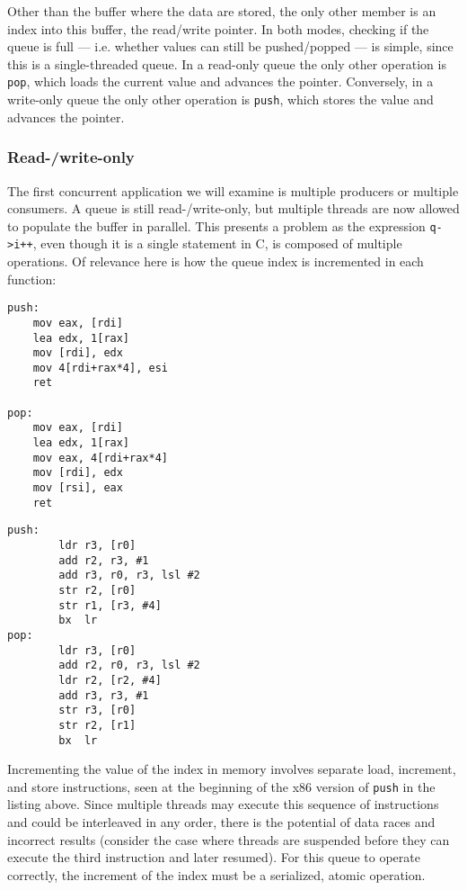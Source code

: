 Other than the buffer where the data are stored, the only other member is an
index into this buffer, the read/write pointer.  In both modes, checking if the
queue is full ---  i.e. whether values can still be pushed/popped --- is simple,
since this is a single-threaded queue.  In a read-only queue the only other
operation is \texttt{pop}, which loads the current value and advances the
pointer.  Conversely, in a write-only queue the only other operation is
\texttt{push}, which stores the value and advances the pointer.

\subsubsection{Read-/write-only}

The first concurrent application we will examine is multiple producers or
multiple consumers.  A queue is still read-/write-only, but multiple threads are
now allowed to populate the buffer in parallel.  This presents a problem as the
expression \texttt{q->i++}, even though it is a single statement in C, is
composed of multiple operations.  Of relevance here is how the queue index is
incremented in each function:

\begin{multicols}{2}
    \begin{lstlisting}[style=x86,showlines=true]
push:
    mov eax, [rdi]
    lea edx, 1[rax]
    mov [rdi], edx
    mov 4[rdi+rax*4], esi
    ret

pop:
    mov eax, [rdi]
    lea edx, 1[rax]
    mov eax, 4[rdi+rax*4]
    mov [rdi], edx
    mov [rsi], eax
    ret

    \end{lstlisting}
    \columnbreak
    \begin{lstlisting}[style=arm]
push:
        ldr r3, [r0]
        add r2, r3, #1
        add r3, r0, r3, lsl #2
        str r2, [r0]
        str r1, [r3, #4]
        bx  lr
pop:
        ldr r3, [r0]
        add r2, r0, r3, lsl #2
        ldr r2, [r2, #4]
        add r3, r3, #1
        str r3, [r0]
        str r2, [r1]
        bx  lr
    \end{lstlisting}
\end{multicols}
\vspace{-\baselineskip}

Incrementing the value of the index in memory involves separate load, increment,
and store instructions, seen at the beginning of the x86 version of
\texttt{push} in the listing above\footnotemark.  Since multiple threads may
execute this sequence of instructions and could be interleaved in any order,
there is the potential of data races and incorrect results (consider the case
where threads are suspended before they can execute the third instruction and
later resumed).  For this queue to operate correctly, the increment of the index
must be a serialized, atomic operation.

